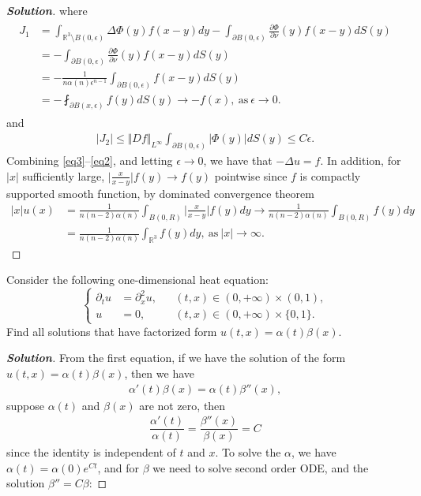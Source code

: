 \documentclass[11pt,reqno]{amsart}
\newcommand{\R}{\mathbb{R}}
\newcommand{\<}{\langle}
\renewcommand{\>}{\rangle}
\newcommand{\norm}[1]{\vert#1\vert}
\newcommand{\nnorm}[1]{\Vert#1\Vert}
\newcommand{\pa}{\partial}
\begin{document}
\begin{enumerate}[label={\arabic*.}]
\begin{proof}[\bf{Solution}]
where
\begin{align}
\begin{split}
J_1 
&= \int_{\R^3 \setminus B(0,\epsilon)} \Delta \Phi(y) f(x-y) dy -\int_{\pa B(0,\epsilon)} \frac{\pa \Phi}{\pa \nu}(y) f(x-y) dS(y) \\
&=
-\int_{\pa B(0,\epsilon)} \frac{\pa \Phi}{\pa \nu}(y) f(x-y) dS(y)\\
&=
-\frac{1}{n\alpha(n) \epsilon^{n-1}} \int_{\pa B(0,\epsilon)} f(x-y)dS(y)\\
&=
-\fint_{\pa B(x,\epsilon)} f(y) dS(y)\rightarrow -f(x), \ \text{as} \ \epsilon \rightarrow 0.
\label{eq1}
\end{split}
\end{align}
and
\begin{align}
\norm{J_2} \leq \nnorm{Df}_{L^\infty} \int_{\pa B(0,\epsilon)} \norm{\Phi(y)}  dS(y) \leq C\epsilon.
\label{eq2}
\end{align}
Combining \eqref{eq3}--\eqref{eq2}, and letting $\epsilon \rightarrow 0$, we have that $-\Delta u = f$. In addition, for $\norm{x}$ sufficiently large, $\norm{\frac{x}{x-y}} f(y) \rightarrow f(y)$ pointwise since $f$ is compactly supported smooth function, by dominated convergence theorem
\begin{align*}
\norm{x} u(x) 
&= \frac{1}{n(n-2) \alpha(n)} \int_{B(0,R)}  \norm{\frac{x}{x-y}} f(y) dy \rightarrow \frac{1}{n(n-2) \alpha (n)} \int_{B(0,R)} f(y) dy\\
& = \frac{1}{n(n-2) \alpha (n)} \int_{\R^3} f(y) dy, \ \text{as} \ \norm{x} \rightarrow \infty.
\end{align*}
\end{proof}





\newpage
\begin{tcolorbox}
\item Consider the following one-dimensional heat equation:
\[
\left\{
\begin{aligned}
\partial_t u & = \partial_x^2 u,  && (t,x) \in (0, +\infty) \times (0,1),\\
u & = 0,  && (t,x) \in (0, +\infty)\times \{0,1\}.
\end{aligned}
\right.
\]
Find all solutions that have factorized form $u(t,x) = \alpha (t) \beta (x)$.
\end{tcolorbox}
\bigskip


\begin{proof}[\bf{Solution}]
From the first equation, if we have the solution of the form $u(t,x) =\alpha (t) \beta (x)$, then we have 
\begin{align*}
 \alpha'(t) \beta (x) = \alpha (t) \beta'' (x),
\end{align*}
suppose $\alpha (t)$ and $\beta (x)$ are not zero, then
\begin{align*}
\dfrac{\alpha'(t)}{\alpha (t)} = \dfrac{\beta''(x)}{\beta (x)} =C
\end{align*}
since the identity is independent of $t$ and $x$. To solve the $\alpha$, we have $\alpha (t) = \alpha (0) e^{Ct}$, and for $\beta$ we need to solve second order ODE, and the solution $\beta ''  = C \beta$:



\end{proof}
\end{enumerate}
\end{document}
